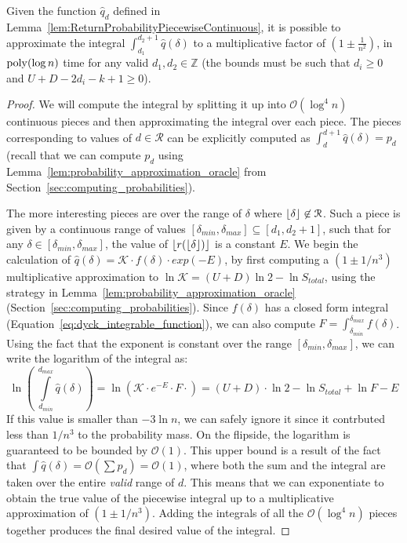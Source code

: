 \begin{lemma}
\label{lem:ReturnProbabilityPiecewiseContinuousIntegral}
Given the function $\hat q_d$ defined in Lemma~\ref{lem:ReturnProbabilityPiecewiseContinuous},
it is possible to approximate the integral $\int_{d_1}^{d_2+1} \hat q(\delta)$ to a multiplicative factor of $\left( 1\pm \frac{1}{n^2} \right)$,
in $\mathrm{poly}(\log n)$ time for any valid $d_1, d_2\in \mathbb Z$ (the bounds must be such that $d_i \ge 0$ and $U+D-2d_i-k+1 \ge 0$).
\end{lemma}
\begin{proof}
We will compute the integral by splitting it up into $\mathcal O(\log^4 n)$ continuous pieces and then approximating the integral over each piece.
The pieces corresponding to values of $d\in \mathcal R$ can be explicitly computed as $\int_d^{d+1} \hat q(\delta) = p_d$
(recall that we can compute $p_d$ using Lemma~\ref{lem:probability_approximation_oracle} from Section~\ref{sec:computing_probabilities}).

The more interesting pieces are over the range of $\delta$ where $\lfloor\delta\rfloor\not\in \mathcal R$.
Such a piece is given by a continuous range of values $[\delta_{min}, \delta_{max}]\subseteq [d_1, d_2+1]$,
such that for any $\delta\in [\delta_{min}, \delta_{max}]$, the value of $\lfloor r(\lfloor\delta\rfloor)\rfloor$ is a constant $E$.
We begin the calculation of $\hat q(\delta) = \mathcal K\cdot f(\delta)\cdot exp(-E)$,
by first computing a $\left( 1\pm 1/n^3\right)$ multiplicative approximation to $\ln \mathcal K = (U + D)\ln 2 - \ln S_{total}$,
using the strategy in Lemma~\ref{lem:probability_approximation_oracle} (Section~\ref{sec:computing_probabilities}).
Since $f(\delta)$ has a closed form integral (Equation~\ref{eq:dyck_integrable_function}),
we can also compute $F = \int_{\delta_{min}}^{\delta_{max}} f(\delta)$.
Using the fact that the exponent is constant over the range $[\delta_{min},\delta_{max}]$, we can write the logarithm of the integral as:
\[
\ln\left(\ \int\limits_{d_{min}}^{d_{max}} \hat q(\delta)\right) = \ln \left( \mathcal K\cdot e^{-E}\cdot F\cdot\right)
= (U + D)\cdot \ln 2 - \ln S_{total} + \ln F - E
\]
If this value is smaller than $-3\ln n$, we can safely ignore it since it contrbuted less than $1/n^3$ to the probability mass.
On the flipside, the logarithm is guaranteed to be bounded by $\mathcal O(1)$.
This upper bound is a result of the fact that $\int \hat q(\delta) = \mathcal O(\sum p_d) = \mathcal O(1)$,
where both the sum and the integral are taken over the entire \emph{valid} range of $d$.
This means that we can exponentiate to obtain the true value of the piecewise integral up to a multiplicative approximation of $(1\pm 1/n^3)$.
Adding the integrals of all the $\mathcal O(\log^4 n)$ pieces together produces the final desired value of the integral.
\end{proof}


